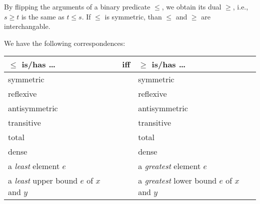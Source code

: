 \begin{remark}[Duality]\label{rem:binarypred:dual}
By flipping the arguments of a binary predicate $\leq$, we obtain its dual $\geq$, i.e., $s\geq t$ is the same as $t\leq s$.
If $\leq$ is symmetric, than $\leq$ and $\geq$ are interchangable.

We have the following correspondences:
\begin{center}
 \begin{tabular}{|lcl|}
 \hline
 $\leq$ is/has \ldots & iff & $\geq$ is/has \ldots\\
 \hline
 symmetric && symmetric \\
 reflexive && reflexive \\
 antisymmetric && antisymmetric \\
 transitive && transitive \\
 total && total \\
 dense && dense \\
 a \emph{least} element $e$ && a \emph{greatest} element $e$ \\
 a \emph{least} upper bound $e$ of $x$ and $y$ && a \emph{greatest} lower bound $e$ of $x$ and $y$\\
 \hline
 \end{tabular}
\end{center}
\end{remark}


